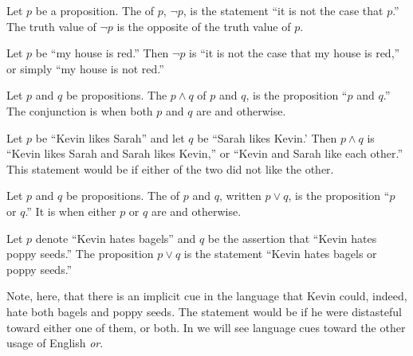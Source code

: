 \begin{defn}[negation]
  Let \(p\) be a proposition.
  The  of \(p\),
  $\neg p$,
  is the statement
  ``it is not the case that \(p\).''
  The truth value of \(\neg p\) is the opposite of the truth value of \(p\).
\end{defn}

\begin{ex}
  Let $p$ be ``my house is red.''
  Then $\neg p$ is
  ``it is not the case that my house is red,''
  or simply
  ``my house is not red.''
\end{ex}

\begin{defn}[conjunction]
  Let $p$ and $q$ be propositions.
  The 
  $p \wedge q$
  of $p$ and $q$,
  is the proposition
  ``$p$ and $q$.''
  The conjunction is \ltrue{} when both $p$ and $q$ are \ltrue{} and \lfalse{} otherwise.
\end{defn}

\begin{ex}
  Let $p$ be ``Kevin likes Sarah'' and let $q$ be ``Sarah likes Kevin.'
  Then $p \wedge q$ is
  ``Kevin likes Sarah and Sarah likes Kevin,''
  or ``Kevin and Sarah like each other.''
  This statement would be \lfalse{} if either of the two did not like the other.
\end{ex}

\begin{defn}[disjunction]
  Let $p$ and $q$ be propositions.
  The 
  of $p$ and $q$,
  written $p \vee q$,
  is the proposition
  ``$p$ or $q$.''
  It is \ltrue{} when either $p$ or $q$ are \ltrue{} and \lfalse{} otherwise.
\end{defn}

\begin{ex}
  Let $p$ denote ``Kevin hates bagels'' and
  $q$ be the assertion that ``Kevin hates poppy seeds.''
  The proposition $p \vee q$ is the statement ``Kevin hates bagels or poppy seeds.''
  \begin{remark}
    Note, here, that there is an implicit cue in the language that Kevin could,
    indeed, hate both bagels and poppy seeds.
    The statement would be \ltrue{} if he were distasteful toward either one of them,
    or both. In  we will see language cues toward the
    other usage of English \emph{or}.
  \end{remark}
\end{ex}

